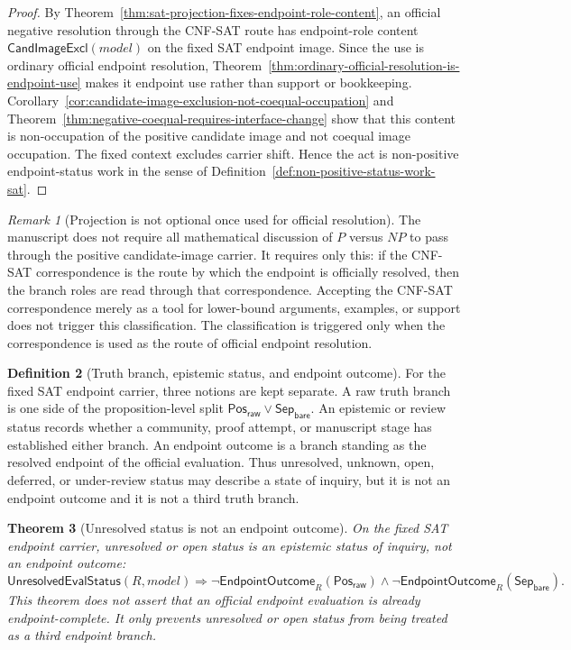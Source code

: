\documentclass[11pt]{article}
\newtheorem{theorem}{Theorem}[section]
\theoremstyle{definition}
\newtheorem{definition}[theorem]{Definition}
\theoremstyle{remark}
\newtheorem{remark}[theorem]{Remark}
\newcommand{\PosRaw}{\mathsf{Pos}_{\mathsf{raw}}}
\newcommand{\SepBare}{\mathsf{Sep}_{\mathsf{bare}}}
\newcommand{\CandImageExcl}{\mathsf{CandImageExcl}}
\newcommand{\UnresolvedEvalStatus}{\mathsf{UnresolvedEvalStatus}}
\newcommand{\EndpointOutcome}{\mathsf{EndpointOutcome}}
\begin{document}
\begin{proof}
By Theorem~\ref{thm:sat-projection-fixes-endpoint-role-content}, an official negative resolution through the CNF-SAT route has endpoint-role content \(\CandImageExcl(model)\) on the fixed SAT endpoint image. Since the use is ordinary official endpoint resolution, Theorem~\ref{thm:ordinary-official-resolution-is-endpoint-use} makes it endpoint use rather than support or bookkeeping. Corollary~\ref{cor:candidate-image-exclusion-not-coequal-occupation} and Theorem~\ref{thm:negative-coequal-requires-interface-change} show that this content is non-occupation of the positive candidate image and not coequal image occupation. The fixed context excludes carrier shift. Hence the act is non-positive endpoint-status work in the sense of Definition~\ref{def:non-positive-status-work-sat}.
\end{proof}

\begin{remark}[Projection is not optional once used for official resolution]\label{rem:projection-not-optional-once-used}
The manuscript does not require all mathematical discussion of \(P\) versus \(NP\) to pass through the positive candidate-image carrier. It requires only this: if the CNF-SAT correspondence is the route by which the endpoint is officially resolved, then the branch roles are read through that correspondence. Accepting the CNF-SAT correspondence merely as a tool for lower-bound arguments, examples, or support does not trigger this classification. The classification is triggered only when the correspondence is used as the route of official endpoint resolution.
\end{remark}

\begin{definition}[Truth branch, epistemic status, and endpoint outcome]
\label{def:truth-epistemic-endpoint-outcome}
For the fixed SAT endpoint carrier, three notions are kept separate.
A raw truth branch is one side of the proposition-level split \(\PosRaw\vee\SepBare\). An epistemic or review status records whether a community, proof attempt, or manuscript stage has established either branch. An endpoint outcome is a branch standing as the resolved endpoint of the official evaluation. Thus unresolved, unknown, open, deferred, or under-review status may describe a state of inquiry, but it is not an endpoint outcome and it is not a third truth branch.
\end{definition}

\begin{theorem}[Unresolved status is not an endpoint outcome]
\label{thm:unresolved-not-endpoint-outcome}
On the fixed SAT endpoint carrier, unresolved or open status is an epistemic status of inquiry, not an endpoint outcome:
\[
  \UnresolvedEvalStatus(R,model)\Rightarrow
  \neg\EndpointOutcome_R(\PosRaw)\wedge\neg\EndpointOutcome_R(\SepBare).
\]
This theorem does not assert that an official endpoint evaluation is already endpoint-complete. It only prevents unresolved or open status from being treated as a third endpoint branch.
\end{theorem}
\end{document}
